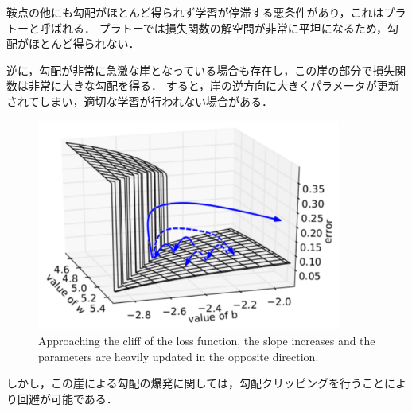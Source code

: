     鞍点の他にも勾配がほとんど得られず学習が停滞する悪条件があり，これはプラトーと呼ばれる．
    プラトーでは損失関数の解空間が非常に平坦になるため，勾配がほとんど得られない．
    
    逆に，勾配が非常に急激な崖となっている場合も存在し，この崖の部分で損失関数は非常に大きな勾配を得る．
    すると，崖の逆方向に大きくパラメータが更新されてしまい，適切な学習が行われない場合がある．
    \begin{figure}[ht]
        \begin{center}
            \centering
            \includegraphics[width=10cm]{8_appendix/img/cliff}
            \caption{Approaching the cliff of the loss function, the slope increases and the parameters are heavily updated in the opposite direction\cite{pascanu2013difficulty}.}
        \end{center}
    \end{figure}
    しかし，この崖による勾配の爆発に関しては，勾配クリッピング\cite{pascanu2013difficulty}を行うことにより回避が可能である．

